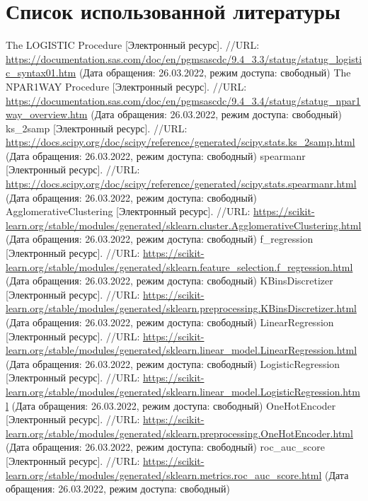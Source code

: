 \documentclass[12pt,a4paper]{article}
\begin{document}
  \section{Список использованной литературы}
  \begin{thebibliography}{3}
     The LOGISTIC Procedure [Электронный ресурс]. //URL: \url{https://documentation.sas.com/doc/en/pgmsascdc/9.4_3.3/statug/statug_logistic_syntax01.htm} (Дата обращения: 26.03.2022, режим доступа: свободный)
     The NPAR1WAY Procedure [Электронный ресурс]. //URL: \url{https://documentation.sas.com/doc/en/pgmsascdc/9.4_3.4/statug/statug_npar1way_overview.htm} (Дата обращения: 26.03.2022, режим доступа: свободный)
     ks\_2samp [Электронный ресурс]. //URL: \url{https://docs.scipy.org/doc/scipy/reference/generated/scipy.stats.ks_2samp.html} (Дата обращения: 26.03.2022, режим доступа: свободный)
     spearmanr [Электронный ресурс]. //URL: \url{https://docs.scipy.org/doc/scipy/reference/generated/scipy.stats.spearmanr.html} (Дата обращения: 26.03.2022, режим доступа: свободный)
     AgglomerativeClustering [Электронный ресурс]. //URL: \url{https://scikit-learn.org/stable/modules/generated/sklearn.cluster.AgglomerativeClustering.html} (Дата обращения: 26.03.2022, режим доступа: свободный)
     f\_regression [Электронный ресурс]. //URL: \url{https://scikit-learn.org/stable/modules/generated/sklearn.feature_selection.f_regression.html} (Дата обращения: 26.03.2022, режим доступа: свободный)
     KBinsDiscretizer [Электронный ресурс]. //URL: \url{https://scikit-learn.org/stable/modules/generated/sklearn.preprocessing.KBinsDiscretizer.html} (Дата обращения: 26.03.2022, режим доступа: свободный)
     LinearRegression [Электронный ресурс]. //URL: \url{https://scikit-learn.org/stable/modules/generated/sklearn.linear_model.LinearRegression.html} (Дата обращения: 26.03.2022, режим доступа: свободный)
     LogisticRegression [Электронный ресурс]. //URL: \url{https://scikit-learn.org/stable/modules/generated/sklearn.linear_model.LogisticRegression.html} (Дата обращения: 26.03.2022, режим доступа: свободный)
     OneHotEncoder [Электронный ресурс]. //URL: \url{https://scikit-learn.org/stable/modules/generated/sklearn.preprocessing.OneHotEncoder.html} (Дата обращения: 26.03.2022, режим доступа: свободный)
     roc\_auc\_score [Электронный ресурс]. //URL: \url{https://scikit-learn.org/stable/modules/generated/sklearn.metrics.roc_auc_score.html} (Дата обращения: 26.03.2022, режим доступа: свободный)
  \end{thebibliography}
\end{document}
